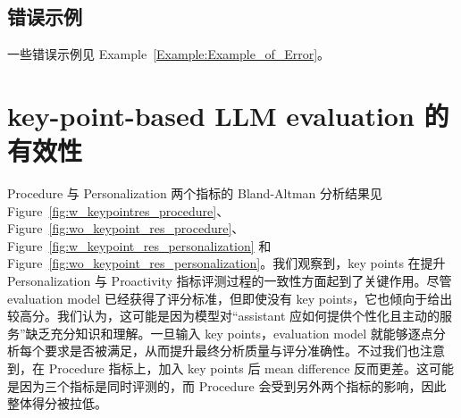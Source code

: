 \documentclass[11pt]{article}
\begin{document}
\subsection{错误示例}
\label{sec:appendix_example_error}
一些错误示例见 Example~\ref{Example:Example_of_Error}。

\section{key-point-based LLM evaluation 的有效性}

\label{sec:appendix_effectiveness_of_key-point-based_LLM_evaluation}
Procedure 与 Personalization 两个指标的 Bland-Altman 分析结果见 Figure~\ref{fig:w_keypointres_procedure}、Figure~\ref{fig:wo_keypoint_res_procedure}、Figure~\ref{fig:w_keypoint_res_personalization} 和 Figure~\ref{fig:wo_keypoint_res_personalization}。我们观察到，key points 在提升 Personalization 与 Proactivity 指标评测过程的一致性方面起到了关键作用。尽管 evaluation model 已经获得了评分标准，但即使没有 key points，它也倾向于给出较高分。我们认为，这可能是因为模型对“assistant 应如何提供个性化且主动的服务”缺乏充分知识和理解。一旦输入 key points，evaluation model 就能够逐点分析每个要求是否被满足，从而提升最终分析质量与评分准确性。不过我们也注意到，在 Procedure 指标上，加入 key points 后 mean difference 反而更差。这可能是因为三个指标是同时评测的，而 Procedure 会受到另外两个指标的影响，因此整体得分被拉低。
\end{document}
